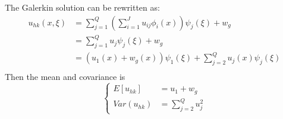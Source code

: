 \begin{theorem}
    The Galerkin solution can be rewritten as:
    \begin{equation}
        \begin{aligned}
            u_{hk}(x, \xi) &=\sum_{j=1}^{Q}\left(\sum_{i=1}^{J}u_{ij}\phi_i(x)\right)\psi_j(\xi)+w_g\\
            &=\sum_{j=1}^{Q}u_j\psi_j(\xi)+w_g\\
            &= (u_1(x)+w_g(x))\psi_1(\xi) + \sum_{j=2}^{Q}u_j(x)\psi_j(\xi)\\
        \end{aligned}
    \end{equation}
    Then the mean and covariance is 
    \begin{equation}\left\{
        \begin{aligned}
            E[u_{hk}] &= u_1+w_g\\
            Var(u_{hk}) &= \sum_{j=2}^{Q}u_j^2
        \end{aligned}\right.
    \end{equation}
\end{theorem}
